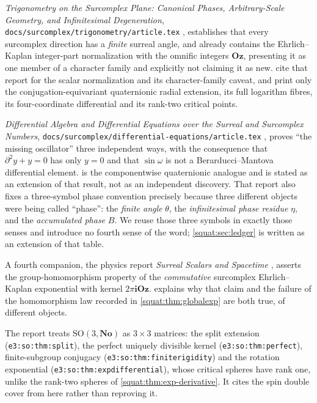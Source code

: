 \documentclass[11pt,letterpaper]{article}
\numberwithin{equation}{section}
\theoremstyle{definition}
\theoremstyle{remark}
\newcommand{\No}{\mathbf{No}}
\newcommand{\Oz}{\mathbf{Oz}}
\newcommand{\ii}{\mathbf i}
\begin{document}
\emph{Trigonometry on the Surcomplex Plane: Canonical Phases, Arbitrary-Scale Geometry,
and Infinitesimal Degeneration}, \texttt{docs/surcomplex/trigonometry/article.tex}
\cite{RepoTrig}, establishes that every surcomplex direction has a \emph{finite} surreal
angle, and already contains the Ehrlich--Kaplan integer-part normalization with the
omnific integers $\Oz$, presenting it as one member of a character family and explicitly
not claiming it as new.  cite that report
for the scalar normalization and its character-family caveat, and print only the
conjugation-equivariant quaternionic radial extension, its full logarithm fibres, its
four-coordinate differential and its rank-two critical points.

\emph{Differential Algebra and Differential Equations over the Surreal and Surcomplex
Numbers}, \texttt{docs/surcomplex/differential-equations/article.tex} \cite{RepoDiff},
proves ``the missing oscillator'' three independent ways, with the consequence that
$\partial^2y+y=0$ has only $y=0$ and that $\sin\omega$ is not a Berarducci--Mantova
differential element.  is the componentwise quaternionic
analogue and is stated as an extension of that result, not as an independent discovery.
That report also fixes a three-symbol phase convention precisely because three different
objects were being called ``phase'': the \emph{finite angle} $\theta$, the
\emph{infinitesimal phase residue} $\eta$, and the \emph{accumulated phase} $B$. We
reuse those three symbols in exactly those senses and introduce no fourth sense of the
word; \cref{squat:sec:ledger} is written as an extension of that table.

A fourth companion, the physics report \emph{Surreal Scalars and Spacetime}
\cite{RepoPhys}, asserts the group-homomorphism property of the \emph{commutative}
surcomplex Ehrlich--Kaplan exponential with kernel $2\pi\ii\Oz$.
 explains why that claim and the failure of the homomorphism
law recorded in \cref{squat:thm:globalexp} are both true, of different objects.


{\raggedright The report  treats $\mathrm{SO}(3,\No)$
as $3\times3$ matrices: the split extension (\texttt{e3:so:thm:split}), the
perfect uniquely divisible kernel (\texttt{e3:so:thm:perfect}), finite-subgroup
conjugacy (\texttt{e3:so:thm:finiterigidity}) and the rotation exponential
(\texttt{e3:so:thm:expdifferential}), whose critical spheres have rank one,
unlike the rank-two spheres of \cref{squat:thm:exp-derivative}. It cites the
spin double cover from here rather than reproving it.\par}
\end{document}
